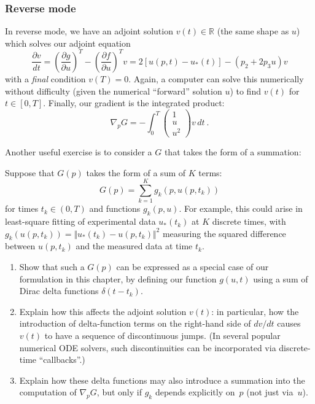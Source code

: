 \subsubsection{Reverse mode}

In reverse mode, we have an adjoint solution $v(t)\in\mathbb{R}$
(the same shape as $u$) which solves our adjoint equation 
\[
 \frac{\partial v}{dt}=\left(\frac{\partial g}{\partial u}\right)^{T} -\left(\frac{\partial f}{\partial u}\right)^{T}v =2\left[u(p,t)-u_{*}(t)\right] - \left(p_{2}+2p_{3}u\right)v
\]
with a \emph{final} condition $v(T)=0.$ Again, a computer can solve
this numerically without difficulty (given the numerical ``forward''
solution $u$) to find $v(t)$ for $t\in[0,T]$. Finally, our gradient
is the integrated  product:
$$
\nabla_{p}G = -\int_{0}^{T}
\left(
\begin{array}{c} 1 \\ u \\ u^{2} \end{array}
\right)
v\,dt\:.
$$

Another useful exercise is to consider a $G$ that takes the form of a summation:
\begin{problem}
\label{prob:discrete-data}
Suppose that $G(p)$ takes the form of a sum of $K$ terms:
$$
G(p) = \sum_{k=1}^{K} g_k(p,u(p,t_k))
$$
for times $t_k \in (0, T)$ and functions $g_k(p,u)$.  For example, this could arise in least-square fitting of  experimental data $u_*(t_k)$ at $K$ discrete times, with $g_k(u(p,t_k)) = \Vert u_*(t_k) -u(p,t_k)\Vert^2 $ measuring the squared difference between $u(p,t_k)$ and the measured data at time $t_k$.
\begin{enumerate}
    \item Show that such a $G(p)$ can be expressed as a special case of our formulation in this chapter, by defining our function $g(u,t)$ using a sum of Dirac delta functions $\delta(t - t_k)$.
    \item Explain how this affects the adjoint solution $v(t)$: in particular, how the introduction of delta-function terms on the right-hand side of $dv/dt$ causes $v(t)$ to have a sequence of discontinuous jumps.  (In several popular numerical ODE solvers, such discontinuities can be incorporated via discrete-time ``callbacks''.)
    \item Explain how these delta functions  may also introduce a summation into the computation of $\nabla_p G$, but only if $g_k$ depends explicitly on~$p$ (not just via~$u$).
\end{enumerate}
\end{problem}


